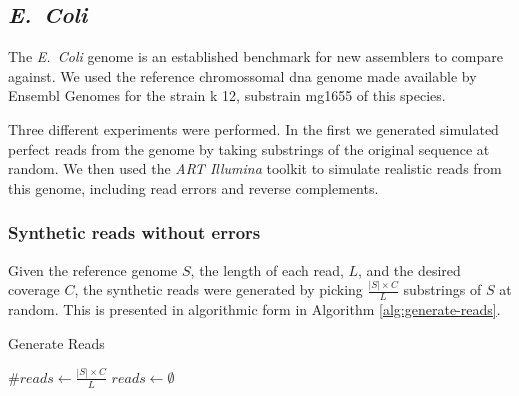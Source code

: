 \subsubsection{\dBHT}

\subsection{\emph{E.~Coli}}

The \emph{E.~Coli} genome is an established benchmark for new assemblers to compare against. We used the reference chromossomal dna
genome made available by Ensembl Genomes for the strain k 12, substrain mg1655 of this species\cite{ecoligenome}.


Three different experiments were performed. In the first we generated simulated perfect reads from the genome by taking substrings of 
the original sequence at random. We then used the \emph{ART Illumina} toolkit  to simulate realistic reads from this
genome, including read errors and reverse complements. 

\subsubsection{Synthetic reads without errors}

Given the reference genome $S$, the length of each read, $L$, and the desired coverage $C$, the synthetic reads were generated by picking
$\frac{|S| \times C}{L}$ substrings of $S$ at random. This is presented in algorithmic form in Algorithm \ref{alg:generate-reads}.

\begin{algorithm}
  \caption{Generate Reads}\label{alg:generate-reads}
  $\mathit{\#reads} \gets \frac{|S| \times C}{L}$\;
  $reads \gets \emptyset$\;
\end{algorithm}

